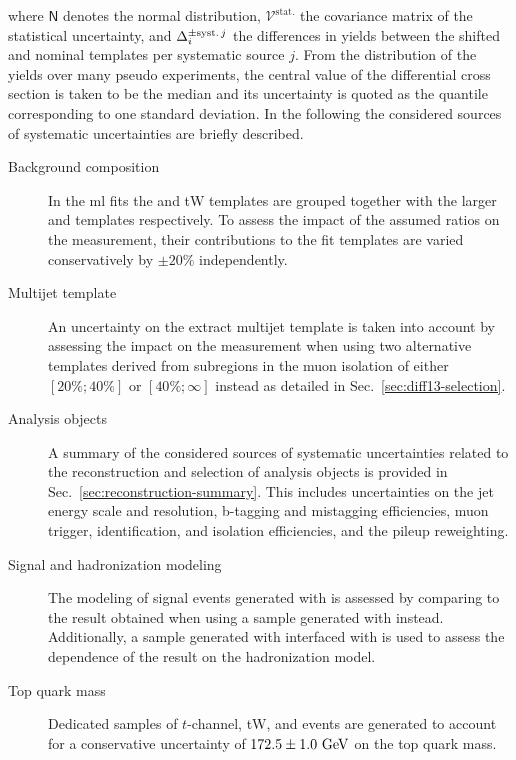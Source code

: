 where $\mathsf{N}$ denotes the normal distribution, $\mathcal{V}^\mathrm{stat.}$ the covariance matrix of the statistical uncertainty, and $\Delta^\scriptn{\mathrm{\pm syst.\,}j}_{i}$ the differences in yields between the shifted and nominal templates per systematic source $j$. From the distribution of the yields over many pseudo experiments, the central value of the differential cross section is taken to be the median and its uncertainty is quoted as the quantile corresponding to one standard deviation. In the following the considered sources of systematic uncertainties are briefly described.

\begin{description}
\item[Background composition] In the \gls{ml} fits the \zjets and tW templates are grouped together with the larger \wjets and \ttbar templates respectively. To assess the impact of the assumed ratios on the measurement, their contributions to the fit templates are varied conservatively by $\pm20\%$ independently.
 
\item[Multijet template] An uncertainty on the extract multijet template is taken into account by assessing the impact on the measurement when using two alternative templates derived from subregions in the muon isolation of either $[20\%; 40\%]$ or $[40\%; \infty]$ instead as detailed in Sec.~\ref{sec:diff13-selection}.

\item[Analysis objects] A summary of the considered sources of systematic uncertainties related to the reconstruction and selection of analysis objects is provided in Sec.~\ref{sec:reconstruction-summary}. This includes uncertainties on the jet energy scale and resolution, b-tagging and mistagging efficiencies, muon trigger, identification, and isolation efficiencies, and the pileup reweighting.

\item[Signal and hadronization modeling] The modeling of signal events generated with \MGAMC is assessed by comparing to the result obtained when using a sample generated with \POWHEG instead. Additionally, a sample generated with \MGAMC interfaced with \HERWIG is used to assess the dependence of the result on the hadronization model.

\item[Top quark mass] Dedicated samples of $t$-channel, tW, and \ttbar events are generated to account for a conservative uncertainty of $172.5\pm1.0~\textrm{GeV}$ on the top quark mass.


\end{description}

